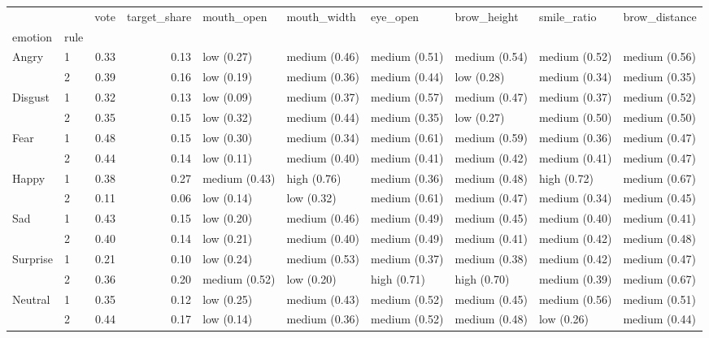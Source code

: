 \begin{tabular}{llrrllllll}
\toprule
        &   &  vote &  target\_share &     mouth\_open &    mouth\_width &       eye\_open &    brow\_height &    smile\_ratio &  brow\_distance \\
emotion & rule &       &               &                &                &                &                &                &                \\
\midrule
Angry & 1 &  0.33 &          0.13 &     low (0.27) &  medium (0.46) &  medium (0.51) &  medium (0.54) &  medium (0.52) &  medium (0.56) \\
        & 2 &  0.39 &          0.16 &     low (0.19) &  medium (0.36) &  medium (0.44) &     low (0.28) &  medium (0.34) &  medium (0.35) \\
Disgust & 1 &  0.32 &          0.13 &     low (0.09) &  medium (0.37) &  medium (0.57) &  medium (0.47) &  medium (0.37) &  medium (0.52) \\
        & 2 &  0.35 &          0.15 &     low (0.32) &  medium (0.44) &  medium (0.35) &     low (0.27) &  medium (0.50) &  medium (0.50) \\
Fear & 1 &  0.48 &          0.15 &     low (0.30) &  medium (0.34) &  medium (0.61) &  medium (0.59) &  medium (0.36) &  medium (0.47) \\
        & 2 &  0.44 &          0.14 &     low (0.11) &  medium (0.40) &  medium (0.41) &  medium (0.42) &  medium (0.41) &  medium (0.47) \\
Happy & 1 &  0.38 &          0.27 &  medium (0.43) &    high (0.76) &  medium (0.36) &  medium (0.48) &    high (0.72) &  medium (0.67) \\
        & 2 &  0.11 &          0.06 &     low (0.14) &     low (0.32) &  medium (0.61) &  medium (0.47) &  medium (0.34) &  medium (0.45) \\
Sad & 1 &  0.43 &          0.15 &     low (0.20) &  medium (0.46) &  medium (0.49) &  medium (0.45) &  medium (0.40) &  medium (0.41) \\
        & 2 &  0.40 &          0.14 &     low (0.21) &  medium (0.40) &  medium (0.49) &  medium (0.41) &  medium (0.42) &  medium (0.48) \\
Surprise & 1 &  0.21 &          0.10 &     low (0.24) &  medium (0.53) &  medium (0.37) &  medium (0.38) &  medium (0.42) &  medium (0.47) \\
        & 2 &  0.36 &          0.20 &  medium (0.52) &     low (0.20) &    high (0.71) &    high (0.70) &  medium (0.39) &  medium (0.67) \\
Neutral & 1 &  0.35 &          0.12 &     low (0.25) &  medium (0.43) &  medium (0.52) &  medium (0.45) &  medium (0.56) &  medium (0.51) \\
        & 2 &  0.44 &          0.17 &     low (0.14) &  medium (0.36) &  medium (0.52) &  medium (0.48) &     low (0.26) &  medium (0.44) \\
\bottomrule
\end{tabular}
